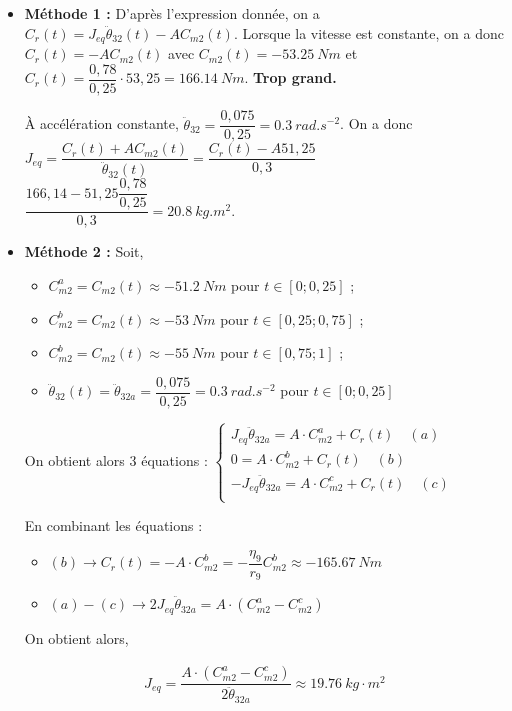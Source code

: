 \documentclass[10pt,fleqn]{article} %
\begin{document}
\subparagraph{}%

\begin{itemize}
\item \textbf{Méthode 1 : }
D'après l'expression donnée, on a $C_r(t)=J_{eq}\ddot{\theta}_{32}(t)-A C_{m2}(t)$.
Lorsque la vitesse est constante, on a donc $C_r(t)=-A C_{m2}(t)$ avec $C_{m2}(t)=-\SI{53,25}{Nm}$ et 
$C_r(t)= \dfrac{0,78}{0,25} \cdot  53,25  = \SI{166,14}{Nm}$.   \textbf{Trop grand.}


À accélération constante, $\ddot{\theta}_{32} = \dfrac{0,075}{0,25}=\SI{0,3}{rad.s^{-2}}$. On a donc 
$J_{eq}=\dfrac{C_r(t)+A C_{m2}(t)}{\ddot{\theta}_{32}(t)}=\dfrac{C_r(t)-A 51,25}{0,3}$ 
$\dfrac{166,14  -51,25\dfrac{0,78}{0,25}}{0,3}=\SI{20,8}{kg.m^2}$. 

\item \textbf{Méthode 2 : }
Soit,
\begin{itemize}
\item $C^{a}_{m2}=C_{m2}(t)\approx-\SI{51,2}{Nm}$ pour $t\in\left[0;0,25\right]$ ;
\item $C^{b}_{m2}=C_{m2}(t)\approx-\SI{53}{Nm}$ pour $t\in\left[0,25;0,75\right]$ ;
\item $C^{b}_{m2}=C_{m2}(t)\approx-\SI{55}{Nm}$ pour $t\in\left[0,75;1\right]$ ;
\item $\ddot{\theta}_{32}(t)=\ddot{\theta}_{32a}=\dfrac{0,075}{0,25}=\SI{0,3}{rad. s^{-2}}$ pour $t\in \left[0;0,25\right]$
\end{itemize}

On obtient alors 3 équations : 
$
\left\{
\begin{array}{l}
J_{eq}\ddot{\theta}_{32a}=A\cdot C^{a}_{m2}+C_r(t) \quad (a)\\
0=A\cdot C^{b}_{m2}+C_r(t)  \quad (b)\\
-J_{eq}\ddot{\theta}_{32a}=A\cdot C^{c}_{m2}+C_r(t)  \quad (c)\\
\end{array}
\right.
$

En combinant les équations : 
\begin{itemize}
\item $(b) \rightarrow C_r(t)=-A\cdot  C^{b}_{m2}=-\dfrac{\eta_9}{r_9}C^{b}_{m2}\approx \SI{-165.67}{Nm}$
\item $(a)-(c)\rightarrow 2 J_{eq} \ddot{\theta}_{32a}=A\cdot \left(C^{a}_{m2}-C^{c}_{m2}\right)$
\end{itemize}

On obtient alors,

\begin{align*}
J_{eq}=\dfrac{A\cdot \left(C^{a}_{m2}-C^{c}_{m2}\right)}{2\ddot{\theta}_{32a}} \approx \SI{19,76}{kg}\cdot m^2
\end{align*}


\end{itemize}
\end{document}
